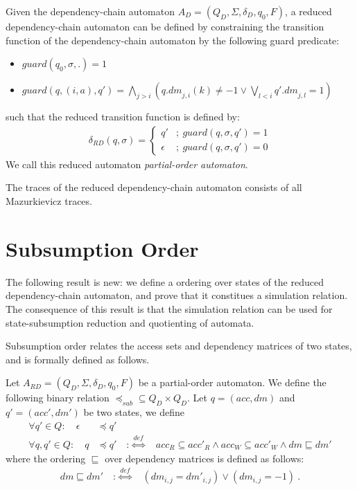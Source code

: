 \documentclass[envcountsame]{llncs}%
\begin{document}
\begin{definition}
\label{def:rautomaton}
%
  Given the dependency-chain automaton $A_D=(Q_D,\Sigma,\delta_D,q_0,F)$,
  a reduced dependency-chain automaton can be defined by constraining the
  transition function of the dependency-chain automaton by the following
  guard predicate:
%
    \begin{itemize}
      \item $guard(q_0,\sigma,.)=1$
      \item $guard(q, (i,a), q')=\bigwedge_{j>i}  ( {q.dm}_{j,i}(k) \neq -1 \vee \bigvee_{l<i} {{q'}.dm}_{j,l}=1)$
    \end{itemize}
%
  such that the reduced transition function is defined by:
%
    \begin{align*}
      \delta_{RD}(q, \sigma) =
        \begin{cases}
          q' & ; \ guard(q,\sigma,q')=1\\
          \epsilon & ; \ guard(q,\sigma,q')=0
        \end{cases}
    \end{align*}
%
We call this reduced automaton \emph{partial-order automaton}.
\end{definition}

\begin{lemma}
  The traces of the reduced dependency-chain automaton consists of
  all Mazurkievicz traces.
\end{lemma}

\section{Subsumption Order}
%
The following result is new: we define a ordering over states of the reduced dependency-chain automaton,
and prove that it constitues a simulation relation.
%
The consequence of this result is that the simulation relation can be used for state-subsumption reduction
and quotienting of automata.

Subsumption order relates the access sets and dependency matrices of two states,
and is formally defined as follows.

\begin{definition}
Let $A_{RD}=(Q_D,\Sigma,\delta_D,q_0,F)$ be a partial-order automaton.
We define the following binary relation $\preceq_{sub} \subseteq Q_D \times Q_D$.
Let $q=(acc, dm)$ and $q'=(acc', dm')$ be two states,
we define
\begin{align*}
\forall q'\in Q:\quad \epsilon &\preceq q' \\
\forall q,q'\in Q:\quad q &\preceq q' \quad :\overset{def}{\Longleftrightarrow} \quad acc_R \subseteq acc'_R \wedge acc_W \subseteq acc'_W \wedge dm \sqsubseteq dm'
\end{align*}
where the ordering $\sqsubseteq$ over dependency matrices is defined as follows:
\begin{align*}
dm \sqsubseteq dm' \quad :\overset{def}{\Longleftrightarrow} \quad \left (dm_{i,j}={dm'}_{i,j}\right) \vee \left (dm_{i,j}=-1 \right) \ .
\end{align*}

\end{definition}
\end{document}
